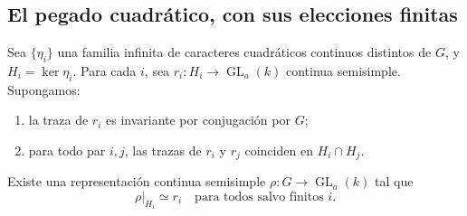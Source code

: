 \subsection{El pegado cuadrático, con sus elecciones finitas}
\label{subsec:gal-pegado}

\begin{teorema}
\label{teo:gal-pegado}
Sea $\{\eta_i\}$ una familia infinita de caracteres cuadráticos
continuos distintos de $G$, y $H_i=\ker\eta_i$.
Para cada $i$, sea $r_i:H_i\to\operatorname{GL}_a(k)$
continua semisimple. Supongamos:
\begin{enumerate}
 \item la traza de $r_i$ es invariante por conjugación por $G$;
 \item para todo par $i,j$, las trazas de $r_i$ y $r_j$
       coinciden en $H_i\cap H_j$.
\end{enumerate}
Existe una representación continua semisimple
$\rho:G\to\operatorname{GL}_a(k)$ tal que
\begin{equation}
 \rho|_{H_i}\simeq r_i
       \quad\text{para todos salvo finitos }i.
 \label{eq:gal-eventual}
\end{equation}
\end{teorema}

